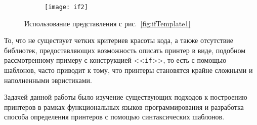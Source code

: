 \begin{figure}[h!]
	\begin{subfigure}[b]{0.60\linewidth}
		\centering
		\texttt{[image: if2]}
		\caption{}
		\label{fig:ifImage2}
	\end{subfigure}
	\hspace{0.5cm}
	\begin{subfigure}[b]{0.30\linewidth}
		\centering
		
		\caption{}
		\label{fig:ifCode2}
	\end{subfigure}

	\caption{Использование представления с рис.~\ref{fig:ifTemplate1}}
\end{figure}

То, что не существует четких критериев красоты кода, а также отсутствие библиотек, предоставляющих возможность описать принтер в виде, подобном
рассмотренному примеру с конструкцией <<\lstinline{if}>>, то есть с помощью шаблонов, часто приводит к тому, что принтеры становятся крайне сложными и наполненными эвристиками.

Задачей данной работы было изучение существующих подходов к построению принтеров в рамках функциональных языков программирования и разработка способа определения принтеров с помощью синтаксических шаблонов.